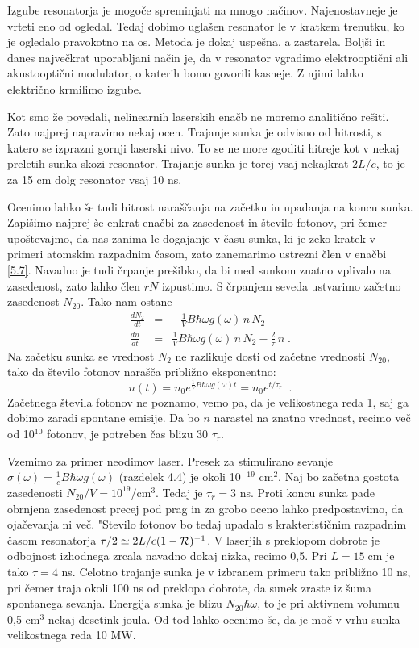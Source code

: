 Izgube resonatorja je mogoče spreminjati na mnogo načinov. Najenostavneje
je vrteti eno od ogledal. Tedaj dobimo uglašen resonator le v kratkem
trenutku, ko je ogledalo pravokotno na os. Metoda je dokaj uspešna, a
zastarela. Boljši in danes največkrat uporabljani način je, da v
resonator vgradimo elektrooptični ali akustooptični modulator, o katerih
bomo govorili kasneje. Z njimi lahko električno krmilimo izgube.

Kot smo že povedali, nelinearnih laserskih enačb ne moremo analitično
rešiti. Zato najprej napravimo nekaj ocen. Trajanje sunka je odvisno od
hitrosti, s katero se izprazni gornji laserski nivo. To se ne more zgoditi
hitreje kot v nekaj preletih sunka skozi resonator. Trajanje sunka je torej
vsaj nekajkrat $2L/c$, to je za 15 cm dolg resonator vsaj 10 ns.

Ocenimo lahko še tudi hitrost naraščanja na začetku in upadanja na koncu
sunka. Zapišimo najprej še enkrat enačbi za zasedenost in število
fotonov, pri čemer upoštevajmo, da nas zanima le dogajanje v času sunka,
ki je zeko kratek v primeri atomskim razpadnim časom, zato zanemarimo
ustrezni člen v enačbi \ref{5.7}. Navadno je tudi črpanje prešibko, da
bi med sunkom znatno vplivalo na zasedenost, zato lahko člen $rN$
izpustimo. S črpanjem seveda ustvarimo začetno zasedenost $N_{20}$. Tako
nam ostane 
\begin{eqnarray}  \label{5.32}
\frac{d N_2}{d t}&=&-\frac{1}{V}B\hbar\omega g(\omega)\,n\,N_2 \\
\frac{d n}{d t}&=&\frac{1}{V}B\hbar\omega g(\omega)\,n\,N_2 - \frac{2}{\tau}%
\,n\;.
\end{eqnarray}
Na začetku sunka se vrednost $N_2$ ne razlikuje dosti od začetne vrednosti 
$N_{20}$, tako da število fotonov narašča približno eksponentno: 
\begin{equation}  \label{5.33}
n(t)=n_0e^{\frac{1}{V}B\hbar\omega g(\omega)t}= n_0e^{t/\tau_r}\;\;.
\end{equation}
Začetnega števila fotonov ne poznamo, vemo pa, da je velikostnega reda 1,
saj ga dobimo zaradi spontane emisije. Da bo $n$ narastel na znatno
vrednost, recimo več od 10$^{10}$ fotonov, je potreben čas blizu 30 $%
\tau_r $.

Vzemimo za primer neodimov laser. Presek za stimulirano sevanje $\sigma
(\omega )=\frac{1}{c}B\hbar \omega g(\omega )$ (razdelek 4.4) je okoli 10$%
^{-19}$ cm$^{2}$. Naj bo začetna gostota zasedenosti $N_{20}/V=10^{19}/%
\mbox{cm}^{3}$. Tedaj je $\tau _{r}=3$ ns. Proti koncu sunka pade obrnjena
zasedenost precej pod prag in za grobo oceno lahko predpostavimo, da
ojačevanja ni več. "Stevilo fotonov bo tedaj upadalo s
krakterističnim razpadnim časom resonatorja $\tau /2\simeq 2L/c(1-{\cal R%
})^{-1}$. V laserjih s preklopom dobrote je odbojnost izhodnega zrcala
navadno dokaj nizka, recimo 0,5. Pri $L=15\;\mbox{cm}$ je tako $\tau =4$ ns.
Celotno trajanje sunka je v izbranem primeru tako približno 10 ns, pri
čemer traja okoli 100 ns od preklopa dobrote, da sunek zraste iz šuma
spontanega sevanja. Energija sunka je blizu $N_{20}\hbar \omega $, to je pri
aktivnem volumnu 0,5 cm$^{3}$ nekaj desetink joula. Od tod lahko ocenimo
še, da je moč v vrhu sunka velikostnega reda 10 MW.

